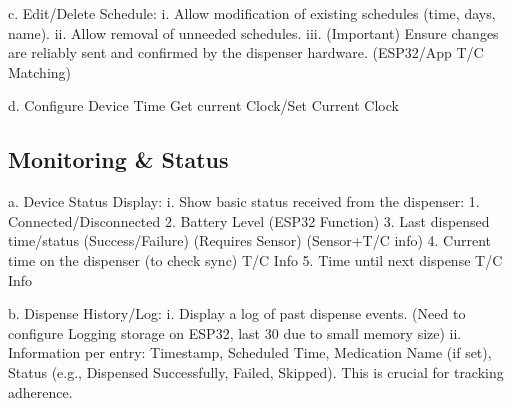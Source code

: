   c. Edit/Delete Schedule:
  i. Allow modification of existing schedules (time, days, name).
  ii. Allow removal of unneeded schedules.
  iii. (Important) Ensure changes are reliably sent and confirmed by the dispenser hardware. (ESP32/App T/C Matching)
  
  d. Configure Device Time Get current Clock/Set Current Clock
  
\subsection{Monitoring \&  Status}

a. Device Status Display:
i. Show basic status received from the dispenser:
1. Connected/Disconnected
2. Battery Level (ESP32 Function)
3. Last dispensed time/status (Success/Failure) (Requires Sensor) (Sensor+T/C info)
4. Current time on the dispenser (to check sync) T/C Info
5. Time until next dispense T/C Info

b. Dispense History/Log:
i. Display a log of past dispense events. (Need to configure Logging storage on ESP32, last 30 due to small memory size)
ii. Information per entry: Timestamp, Scheduled Time, Medication Name (if set), Status (e.g., Dispensed Successfully, Failed, Skipped). This is crucial for tracking adherence.
